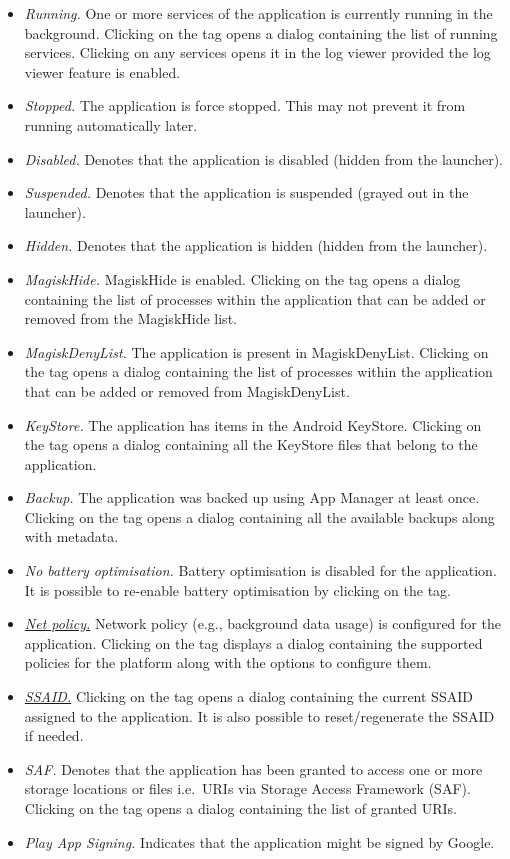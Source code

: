 \begin{itemize}
\begin{itemize}
        \item \textit{Running.} One or more services of the application is currently running in the background. Clicking
        on the tag opens a dialog containing the list of running services. Clicking on any services opens it in the log
        viewer provided the log viewer feature is enabled.
        \item \textit{Stopped.} The application is force stopped. This may not prevent it from running automatically
        later.
        \item \textit{Disabled.} Denotes that the application is disabled (hidden from the launcher).
        \item \textit{Suspended.} Denotes that the application is suspended (grayed out in the launcher).
        \item \textit{Hidden.} Denotes that the application is hidden (hidden from the launcher).
        \item \textit{MagiskHide.} MagiskHide is enabled. Clicking on the tag opens a dialog containing the list of
        processes within the application that can be added or removed from the MagiskHide list.
        \item \textit{MagiskDenyList.} The application is present in MagiskDenyList. Clicking on the tag opens a dialog
        containing the list of processes within the application that can be added or removed from MagiskDenyList.
        \item \textit{KeyStore.} The application has items in the Android KeyStore. Clicking on the tag opens a dialog
        containing all the KeyStore files that belong to the application.
        \item \textit{Backup.} The application was backed up using App Manager at least once. Clicking on the tag
        opens a dialog containing all the available backups along with metadata.
        \item \textit{No battery optimisation.} Battery optimisation is disabled for the application. It is possible to
        re-enable battery optimisation by clicking on the tag.
        \item \hyperref[sec:net-policy]{\textit{Net policy.}} Network policy (e.g., background data usage) is configured
        for the application. Clicking on the tag displays a dialog containing the supported policies for the platform
        along with the options to configure them.
        \item \hyperref[sec:terminologies]{\textit{SSAID.}} Clicking on the tag opens a dialog containing the current
        SSAID assigned to the application. It is also possible to reset/regenerate the SSAID if needed.
        \item \textit{SAF.} Denotes that the application has been granted to access one or more storage locations or
        files i.e.\ URIs via Storage Access Framework (SAF). Clicking on the tag opens a dialog containing the list of
        granted URIs.
        \item \textit{Play App Signing.} Indicates that the application might be signed by Google.
    \end{itemize}


\end{itemize}
